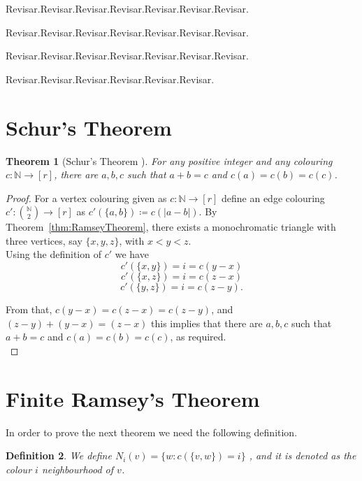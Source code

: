 \documentclass[12pt,twoside,a4paper,bibliography=totocnumbered]{book}
\numberwithin{equation}{section}
\newtheorem{theorem}             {Theorem}[section]
\newtheorem{definition}	[theorem] {Definition}
\theoremstyle{remark}
\begin{document}
Revisar.Revisar.Revisar.Revisar.Revisar.Revisar.Revisar.

Revisar.Revisar.Revisar.Revisar.Revisar.Revisar.Revisar.

Revisar.Revisar.Revisar.Revisar.Revisar.Revisar.Revisar.

Revisar.Revisar.Revisar.Revisar.Revisar.Revisar.

\section{Schur's Theorem}

\begin{theorem}[{Schur's Theorem \cite{Sc16}}]\label{thm:Schur'sTheorem} %
For any positive integer and any colouring $c\colon \mathbb{N} \rightarrow [r]$, there are $a,b,c$ such that $a+b=c$ and $c(a) = c(b) = c(c)$.
\end{theorem}
\begin{proof}
  For a vertex colouring given as $c\colon \mathbb{N} \rightarrow [r]$ define an edge colouring $c'\colon \binom{\mathbb{N}}{2} \rightarrow [r]$ as $c'(\{a,b\}) \coloneqq c(|a-b|)$. By Theorem~\ref{thm:RamseyTheorem}, there exists a monochromatic triangle with three vertices, say $\{x,y,z\}$, with $x<y<z$.\\
Using the definition of $c'$  we have
$$c'(\{x,y\}) = i = c(y-x)$$
$$c'(\{x,z\})=  i = c(z-x)$$
$$c'(\{y,z\}) = i = c(z-y).$$

From that, $c(y-x) = c(z-x) = c(z-y)$, and $(z-y)+(y-x)=(z-x)$ this implies that there are $a,b,c$ such that $a+b=c$ and $c(a) = c(b) = c(c)$, as required.\\
\end{proof}

\section{Finite Ramsey's Theorem}
In order to prove the next theorem we need the following definition.
\begin{definition}
We define $N_i(v) =\{ w: c(\{v,w\})=i\}$ , and it is denoted as the colour $i$ neighbourhood of $v$.
\end{definition}
\end{document}
